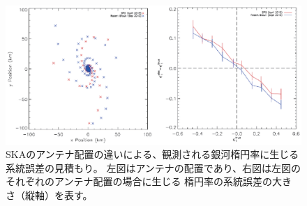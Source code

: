 \begin{figure}[t]
 \begin{center}
   \includegraphics[width=0.95\linewidth]{cosmology/lensing_ellipse.eps} 
   \caption{SKAのアンテナ配置の違いによる、観測される銀河楕円率に生じる系統誤差の見積もり。
左図はアンテナの配置であり、右図は左図のそれぞれのアンテナ配置の場合に生じる
楕円率の系統誤差の大きさ（縦軸）を表す\cite{Patel:2015cra}。}\label{fig:weak_ellipse}
 \end{center}
\end{figure}


